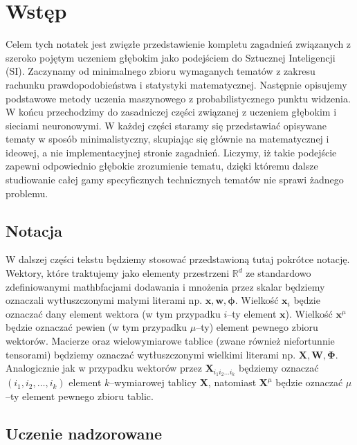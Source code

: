 \documentclass{myclass}
\numberwithin{equation}{section}
\begin{document}
\tableofcontents
\newpage

\section{Wstęp}

Celem tych notatek jest zwięzłe przedstawienie kompletu zagadnień związanych z szeroko pojętym
uczeniem głębokim jako podejściem do Sztucznej Inteligencji (SI). Zaczynamy od minimalnego zbioru
wymaganych tematów z zakresu rachunku prawdopodobieństwa i statystyki matematycznej. Następnie
opisujemy podstawowe metody uczenia maszynowego z probabilistycznego punktu widzenia. W końcu
przechodzimy do zasadniczej części związanej z uczeniem głębokim i sieciami neuronowymi. W każdej
części staramy się przedstawiać opisywane tematy w sposób minimalistyczny, skupiając się głównie na
matematycznej i ideowej, a nie implementacyjnej stronie zagadnień. Liczymy, iż takie podejście
zapewni odpowiednio głębokie zrozumienie tematu, dzięki któremu dalsze studiowanie całej gamy
specyficznych technicznych tematów nie sprawi żadnego problemu.


\subsection{Notacja}

W dalszej części tekstu będziemy stosować przedstawioną tutaj pokrótce notację. Wektory, które
traktujemy jako elementy przestrzeni \(\mathbb{R}^d\) ze standardowo zdefiniowanymi mathbfacjami
dodawania i mnożenia przez skalar będziemy oznaczali wytłuszczonymi małymi literami np.
\(\mathbf{x}, \mathbf{w}, \boldsymbol{\phi}\). Wielkość \(\mathbf{x}_i\) będzie oznaczać dany
element wektora (w tym przypadku \(i\)--ty element \(\mathbf{x}\)). Wielkość \(\mathbf{x}^\mu\)
będzie oznaczać pewien (w tym przypadku \(\mu\)--ty) element pewnego zbioru wektorów. Macierze oraz
wielowymiarowe tablice (zwane również niefortunnie tensorami) będziemy oznaczać wytłuszczonymi
wielkimi literami np. \(\mathbf{X}, \mathbf{W}, \boldsymbol{\Phi}\). Analogicznie jak w przypadku
wektorów przez \(\mathbf{X}_{i_1 i_2 \ldots i_k}\) będziemy oznaczać \((i_1,i_2,\ldots,i_k)\)
element \(k\)--wymiarowej tablicy \(\mathbf{X}\), natomiast \(\mathbf{X}^\mu\) będzie oznaczać
\(\mu\)--ty element pewnego zbioru tablic.


\subsection{Uczenie nadzorowane}
\end{document}
